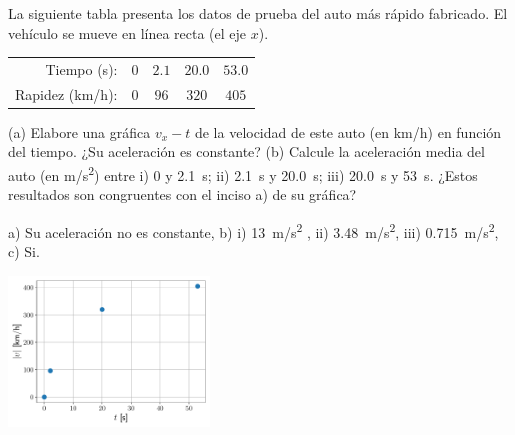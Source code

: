\documentclass[11pt]{article}
\begin{document}
\begin{exercise}
La siguiente tabla presenta los datos de prueba del auto más rápido fabricado. El vehículo se mueve en línea recta (el eje $x$).
\begin{center}
    \begin{tabular}{rcccc}
        \toprule
        Tiempo (\unit{s}):  & $0$ & $2.1$ & $20.0$ & $53.0$  \\
        Rapidez (\unit{km/h}): & $0$ & $96$ & $320$ & $405$ \\
        \bottomrule
    \end{tabular}
\end{center}
(a) Elabore una gráfica $v_x - t$ de la velocidad de este auto (en \unit{km/h}) en función del tiempo. ¿Su aceleración es constante?    (b) Calcule la aceleración media del auto (en \unit{m/s^2}) entre i) \num{0} y \qty{2.1}{s}; ii) \qty{2.1}{s} y \qty{20.0}{s}; iii) \qty{20.0}{s} y \qty{53}{s}. ¿Estos resultados son congruentes con el inciso a) de su gráfica?
\end{exercise}
\begin{solution}
    \begin{multicols}{2}
        a) Su aceleración no es constante, b) i) \qty{13}{m/s^2} , ii) \qty{3.48}{m/s^2}, iii) \qty{0.715}{m/s^2}, c) Si.
\begin{center}
    \includegraphics[width=0.4\textwidth]{figs/ac-08.pdf}
\end{center}
\end{multicols}
\end{solution}
\end{document}
